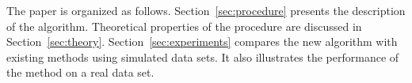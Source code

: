 The paper is organized as follows. Section~\ref{sec:procedure} presents the description of the algorithm. Theoretical properties of the procedure are discussed in Section~\ref{sec:theory}. Section~\ref{sec:experiments} compares the new algorithm with existing methods using simulated data sets. It also illustrates the performance of the method on a real data set. 







%